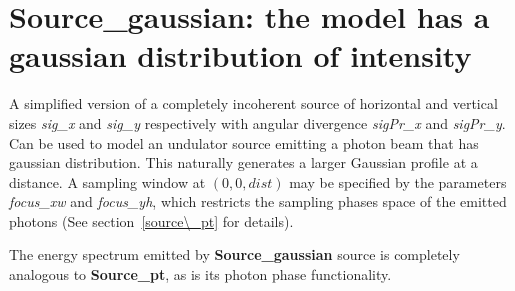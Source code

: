 \section{Source\_gaussian: the model has a gaussian distribution of intensity}
\label{source-gaussian}

A simplified version of a completely incoherent source of horizontal and
vertical sizes \textit{sig\_x} and \textit{sig\_y} respectively with angular divergence
\textit{sigPr\_x} and \textit{sigPr\_y}. Can be used to model an undulator source emitting
a photon beam that has gaussian distribution.
This naturally generates a larger Gaussian profile at a distance. A sampling window at $(0,0,\mathit{dist})$
may be specified by the parameters \textit{focus\_xw} and \textit{focus\_yh}, which restricts the
sampling phases space of the emitted photons (See section~\ref{source\_pt} for details).

The energy spectrum emitted by \textbf{Source\_gaussian} source is completely analogous to \textbf{Source\_pt}, as is 
its photon phase functionality.
